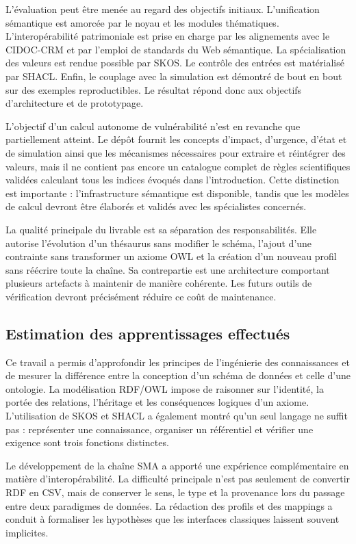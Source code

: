 \documentclass{article}
\begin{document}
L'évaluation peut être menée au regard des objectifs initiaux. L'unification sémantique est amorcée par le noyau et les modules thématiques. L'interopérabilité patrimoniale est prise en charge par les alignements avec le CIDOC-CRM et par l'emploi de standards du Web sémantique. La spécialisation des valeurs est rendue possible par SKOS. Le contrôle des entrées est matérialisé par SHACL. Enfin, le couplage avec la simulation est démontré de bout en bout sur des exemples reproductibles. Le résultat répond donc aux objectifs d'architecture et de prototypage.

L'objectif d'un calcul autonome de vulnérabilité n'est en revanche que partiellement atteint. Le dépôt fournit les concepts d'impact, d'urgence, d'état et de simulation ainsi que les mécanismes nécessaires pour extraire et réintégrer des valeurs, mais il ne contient pas encore un catalogue complet de règles scientifiques validées calculant tous les indices évoqués dans l'introduction. Cette distinction est importante : l'infrastructure sémantique est disponible, tandis que les modèles de calcul devront être élaborés et validés avec les spécialistes concernés.

La qualité principale du livrable est sa séparation des responsabilités. Elle autorise l'évolution d'un thésaurus sans modifier le schéma, l'ajout d'une contrainte sans transformer un axiome OWL et la création d'un nouveau profil sans réécrire toute la chaîne. Sa contrepartie est une architecture comportant plusieurs artefacts à maintenir de manière cohérente. Les futurs outils de vérification devront précisément réduire ce coût de maintenance.

\subsection{Estimation des apprentissages effectués}

Ce travail a permis d'approfondir les principes de l'ingénierie des connaissances et de mesurer la différence entre la conception d'un schéma de données et celle d'une ontologie. La modélisation RDF/OWL impose de raisonner sur l'identité, la portée des relations, l'héritage et les conséquences logiques d'un axiome. L'utilisation de SKOS et SHACL a également montré qu'un seul langage ne suffit pas : représenter une connaissance, organiser un référentiel et vérifier une exigence sont trois fonctions distinctes.

Le développement de la chaîne SMA a apporté une expérience complémentaire en matière d'interopérabilité. La difficulté principale n'est pas seulement de convertir RDF en CSV, mais de conserver le sens, le type et la provenance lors du passage entre deux paradigmes de données. La rédaction des profils et des mappings a conduit à formaliser les hypothèses que les interfaces classiques laissent souvent implicites.
\end{document}
